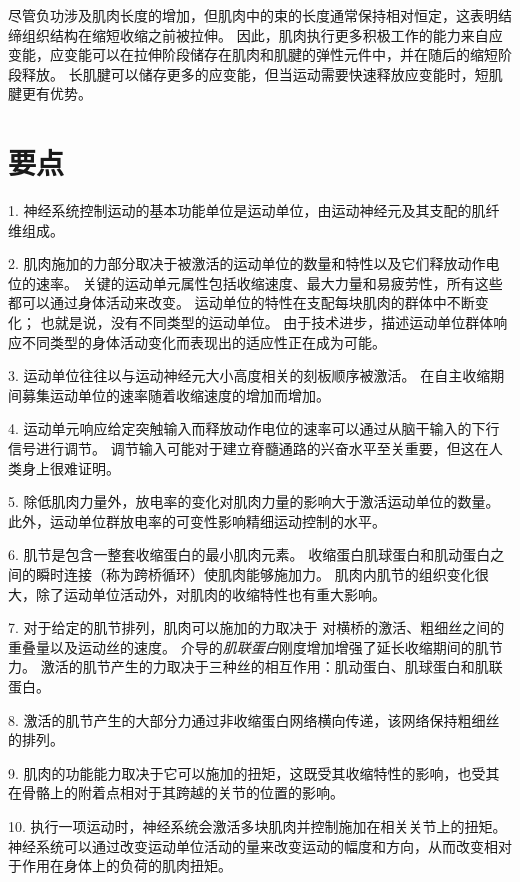 尽管负功涉及肌肉长度的增加，但肌肉中的束的长度通常保持相对恒定，这表明结缔组织结构在缩短收缩之前被拉伸。
因此，肌肉执行更多积极工作的能力来自应变能，应变能可以在拉伸阶段储存在肌肉和肌腱的弹性元件中，并在随后的缩短阶段释放。
长肌腱可以储存更多的应变能，但当运动需要快速释放应变能时，短肌腱更有优势。



\section{要点}

1. 神经系统控制运动的基本功能单位是运动单位，由运动神经元及其支配的肌纤维组成。 


2. 肌肉施加的力部分取决于被激活的运动单位的数量和特性以及它们释放动作电位的速率。
关键的运动单元属性包括收缩速度、最大力量和易疲劳性，所有这些都可以通过身体活动来改变。
运动单位的特性在支配每块肌肉的群体中不断变化；
也就是说，没有不同类型的运动单位。
由于技术进步，描述运动单位群体响应不同类型的身体活动变化而表现出的适应性正在成为可能。


3. 运动单位往往以与运动神经元大小高度相关的刻板顺序被激活。
在自主收缩期间募集运动单位的速率随着收缩速度的增加而增加。


4. 运动单元响应给定突触输入而释放动作电位的速率可以通过从脑干输入的下行信号进行调节。
调节输入可能对于建立脊髓通路的兴奋水平至关重要，但这在人类身上很难证明。


5. 除低肌肉力量外，放电率的变化对肌肉力量的影响大于激活运动单位的数量。
此外，运动单位群放电率的可变性影响精细运动控制的水平。


6. 肌节是包含一整套收缩蛋白的最小肌肉元素。
收缩蛋白肌球蛋白和肌动蛋白之间的瞬时连接（称为跨桥循环）使肌肉能够施加力。
肌肉内肌节的组织变化很大，除了运动单位活动外，对肌肉的收缩特性也有重大影响。


7. 对于给定的肌节排列，肌肉可以施加的力取决于  对横桥的激活、粗细丝之间的重叠量以及运动丝的速度。
 介导的\textit{肌联蛋白}刚度增加增强了延长收缩期间的肌节力。
激活的肌节产生的力取决于三种丝的相互作用：肌动蛋白、肌球蛋白和肌联蛋白。


8. 激活的肌节产生的大部分力通过非收缩蛋白网络横向传递，该网络保持粗细丝的排列。


9. 肌肉的功能能力取决于它可以施加的扭矩，这既受其收缩特性的影响，也受其在骨骼上的附着点相对于其跨越的关节的位置的影响。


10. 执行一项运动时，神经系统会激活多块肌肉并控制施加在相关关节上的扭矩。
神经系统可以通过改变运动单位活动的量来改变运动的幅度和方向，从而改变相对于作用在身体上的负荷的肌肉扭矩。


